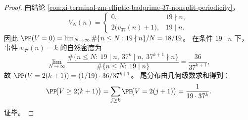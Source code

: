 \begin{proof}
由结论 \ref{con:xi-terminal-zm-elliptic-badprime-37-nonsplit-periodicity}，
\[
V_N(n)=
\begin{cases}
0,&19\nmid n,\\
2\bigl(v_{37}(n)+1\bigr),&19\mid n.
\end{cases}
\]
因此 \(\PP(V=0)=\lim_{N\to\infty}\#\{n\le N:19\nmid n\}/N=18/19\)。
在条件 \(19\mid n\) 下，事件 \(v_{37}(n)=k\) 的自然密度为
\[
\lim_{N\to\infty}\frac{\#\{n\le N:\ 19\mid n,\ 37^k\mid n,\ 37^{k+1}\nmid n\}}{\#\{n\le N:\ 19\mid n\}}
=\frac{36}{37^{k+1}},
\]
故
\(
\PP(V=2(k+1))=(1/19)\cdot 36/37^{k+1}
\)。
尾分布由几何级数求和得到：
\[
\PP\!\bigl(V\ge 2(k+1)\bigr)=\sum_{j\ge k}\PP\!\bigl(V=2(j+1)\bigr)=\frac{1}{19\cdot 37^{k}}.
\]
证毕。
\end{proof}

